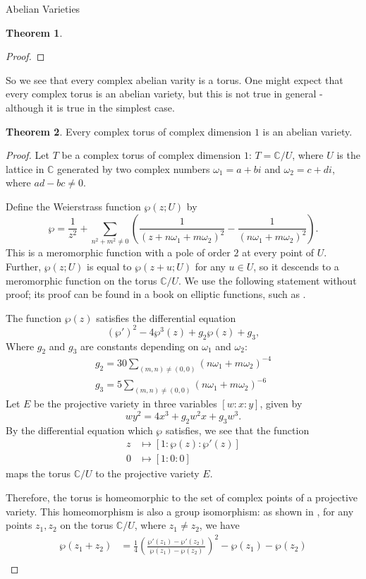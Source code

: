 \documentclass[12pt]{article}
\newcommand{\C}{\mathbb{C}}
\theoremstyle{definition}
\newtheorem{theorem}{Theorem}[section]
\begin{document}
\begin{section}{Abelian Varieties}
\begin{theorem}
\begin{proof}
		\end{proof}
	\end{theorem}
	So we see that every complex abelian varity  is a torus. One might expect that every complex torus is an abelian variety, but this is not true in general - although it is true in the simplest case.
	\begin{theorem}
		Every complex torus of complex dimension $1$ is an abelian variety.
		\begin{proof}
			Let $T$ be a complex torus of complex dimension $1$: $T = \C / U$, where $U$ is the lattice in $\C$ generated by two complex numbers $\omega_1 = a + bi$ and $\omega_2 = c + di$, where $ad -bc \neq 0$.
			\par Define the Weierstrass function $\wp(z; U)$ by
			\[\wp = \frac{1}{z^{2}} + \sum_{n^2 + m^2 \neq 0} \left( \frac{1}{(z + n\omega_1 + m\omega_2)^2} - \frac{1}{(n\omega_1 + m\omega_2)^2} \right).\]
			This is a meromorphic function with a pole of order $2$ at every point of $U$. Further, $\wp(z;U)$ is equal to $\wp(z + u; U)$ for any $u \in U$, so it descends to a meromorphic function on the torus $\C/U$. We use the following statement without proof; its proof can be found in a book on elliptic functions, such as \cite{elliptic}.
			\par The function $\wp(z)$ satisfies the differential equation
			\[(\wp')^2 - 4\wp^3(z) + g_2\wp(z) + g_3,\]
			Where $g_2$ and $g_3$ are constants depending on $\omega_1$ and $\omega_2$:
			\begin{align*}
				g_2 = 30 \sum_{(m, n)\neq (0,0)} \left( n\omega_1 + m \omega_2 \right)^{-4}\\
				g_3 = 5 \sum_{(m,n)\neq (0,0)} \left( n\omega_1 + m\omega_2 \right)^{-6}
			\end{align*}
			Let $E$ be the projective variety in three variables $[w:x:y]$, given by 
		\[wy^2 = 4x^3 + g_2 w^2x + g_3w^3.\]
			By the differential equation which $\wp$ satisfies, we see that the function
			\begin{align*}z &\mapsto [1:\wp(z):\wp'(z)]\\
			0 &\mapsto [1:0:0]\end{align*}
			maps the torus $\C/U$ to the projective variety $E$. 
			\par Therefore, the torus is homeomorphic to the set of complex points of a projective variety. This homeomorphism is also a group isomorphism: as shown in \cite{elliptic}, for any points $z_1, z_2$ on the torus $\C/U$, where $z_1 \neq z_2$, we have
			\begin{align*}\wp(z_1 + z_2) &= \frac{1}{4}\left( \frac{\wp'(z_1) - \wp'(z_2)}{\wp(z_1) - \wp(z_2)} \right)^2 - \wp(z_1) - \wp(z_2)\\

\end{align*}
\end{proof}
\end{theorem}
\end{section}
\end{document}
